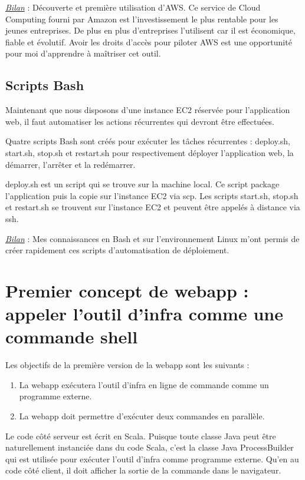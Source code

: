 \underline{\textit{Bilan}} : Découverte et première utilisation d'AWS. Ce
service de Cloud Computing fourni par Amazon est l'investissement le plus
rentable pour les jeunes entreprises. De plus en plus d'entreprises l'utilisent
car il est économique, fiable et évolutif. Avoir les droits d'accès pour piloter
AWS est une opportunité pour moi d'apprendre à maîtriser cet outil.

\subsection{Scripts Bash}

Maintenant que nous disposons d'une instance EC2 réservée pour l'application
web, il faut automatiser les actions récurrentes qui devront être effectuées.

Quatre scripts Bash sont créés pour exécuter les tâches récurrentes :
deploy.sh, start.sh, stop.sh et restart.sh pour respectivement déployer
l'application web, la démarrer, l'arrêter et la redémarrer.

deploy.sh est un script qui se trouve sur la machine local.
Ce script package l'application puis la copie sur l'instance EC2 via scp.
Les scripts start.sh, stop.sh et restart.sh se trouvent sur l'instance EC2 et
peuvent être appelés à distance via ssh.

\underline{\textit{Bilan}} : Mes connaissances en Bash et sur l'environnement
Linux m'ont permis de créer rapidement ces scripts d'automatisation de
déploiement.

\section{Premier concept de webapp : appeler l'outil d'infra comme une commande
  shell}
\noindent Les objectifs de la première version de la webapp sont les suivants :
\begin{enumerate}
\item La webapp exécutera l'outil d'infra en ligne de commande comme un
  programme externe.
\item La webapp doit permettre d'exécuter deux commandes en parallèle.
\end{enumerate}

Le code côté serveur est écrit en Scala.
Puisque toute classe Java peut être naturellement instanciée dans du code Scala,
c'est la classe Java ProcessBuilder qui est utilisée pour exécuter
l'outil d'infra comme programme externe.
Qu'en au code côté client, il doit afficher la sortie de la commande dans le
navigateur.

